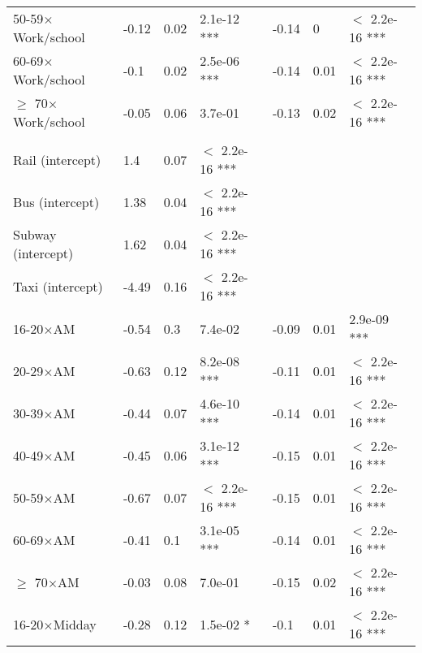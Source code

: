 \documentclass{article}\usepackage[utf8]{inputenc}
\begin{document}
\begin{longtable}[t]{lllllll}
\hspace{1em}50-59$\times$Work/school & -0.12 & 0.02 & 2.1e-12 *** & -0.14 & 0 & $<$ 2.2e-16 ***\\
\hspace{1em}60-69$\times$Work/school & -0.1 & 0.02 & 2.5e-06 *** & -0.14 & 0.01 & $<$ 2.2e-16 ***\\
\hspace{1em}$\geq$ 70$\times$Work/school & -0.05 & 0.06 & 3.7e-01 & -0.13 & 0.02 & $<$ 2.2e-16 ***\\
\addlinespace[0.3em]
\multicolumn{7}{l}{\textbf{Age$\times$Time of day, McFadden $R^2 = 0.55$}}\\
\hline
\hspace{1em}Rail (intercept) & 1.4 & 0.07 & $<$ 2.2e-16 *** &  &  & \\
\hspace{1em}Bus (intercept) & 1.38 & 0.04 & $<$ 2.2e-16 *** &  &  & \\
\hspace{1em}Subway (intercept) & 1.62 & 0.04 & $<$ 2.2e-16 *** &  &  & \\
\hspace{1em}Taxi (intercept) & -4.49 & 0.16 & $<$ 2.2e-16 *** &  &  & \\
\hspace{1em}16-20$\times$AM & -0.54 & 0.3 & 7.4e-02 & -0.09 & 0.01 & 2.9e-09 ***\\
\hspace{1em}20-29$\times$AM & -0.63 & 0.12 & 8.2e-08 *** & -0.11 & 0.01 & $<$ 2.2e-16 ***\\
\hspace{1em}30-39$\times$AM & -0.44 & 0.07 & 4.6e-10 *** & -0.14 & 0.01 & $<$ 2.2e-16 ***\\
\hspace{1em}40-49$\times$AM & -0.45 & 0.06 & 3.1e-12 *** & -0.15 & 0.01 & $<$ 2.2e-16 ***\\
\hspace{1em}50-59$\times$AM & -0.67 & 0.07 & $<$ 2.2e-16 *** & -0.15 & 0.01 & $<$ 2.2e-16 ***\\
\hspace{1em}60-69$\times$AM & -0.41 & 0.1 & 3.1e-05 *** & -0.14 & 0.01 & $<$ 2.2e-16 ***\\
\hspace{1em}$\geq$ 70$\times$AM & -0.03 & 0.08 & 7.0e-01 & -0.15 & 0.02 & $<$ 2.2e-16 ***\\
\hspace{1em}16-20$\times$Midday & -0.28 & 0.12 & 1.5e-02 * & -0.1 & 0.01 & $<$ 2.2e-16 ***\\

\end{longtable}
\end{document}
